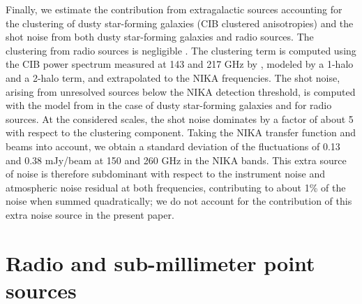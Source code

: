 \documentclass[traditabstract]{aa}
\begin{document}
Finally, we estimate the contribution from extragalactic sources accounting for the clustering of dusty star-forming galaxies (CIB clustered anisotropies) and the shot noise from both dusty star-forming galaxies and radio sources. The clustering from radio sources is negligible \citep{hall2010}. The clustering term is computed using the CIB power spectrum measured at 143 and 217 GHz by \cite{planck2014XXX}, modeled by a 1-halo and a 2-halo term, and extrapolated to the NIKA frequencies. The shot noise, arising from unresolved sources below the NIKA detection threshold, is computed with the model from \cite{bethermin2012} in the case of dusty star-forming galaxies and \cite{tucci2011} for radio sources. At the considered scales, the shot noise dominates by a factor of about 5 with respect to the clustering component. Taking  the NIKA transfer function and beams into
account, we obtain a standard deviation of the fluctuations of 0.13 and 0.38 mJy/beam at 150 and 260 GHz in the NIKA bands. This extra source of noise is therefore subdominant with respect to the instrument noise and atmospheric noise residual at both frequencies, contributing to about 1\% of the noise when summed quadratically;  we do not account for the contribution of this extra noise source in the present paper.

\section{Radio and sub-millimeter point sources}\label{Radio_and_infrared_point_sources}
\end{document}
